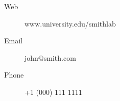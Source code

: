 \begin{description}\compresslist
  \item[Web] www.university.edu/smithlab
  \item[Email] john@smith.com
  \item[Phone] +1 (000) 111 1111
\end{description}
